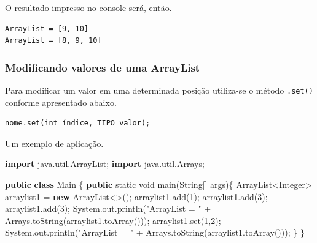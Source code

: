 \documentclass[
]{book}
\newenvironment{Shaded}{\begin{snugshade}}{\end{snugshade}}
\newcommand{\BuiltInTok}[1]{#1}
\newcommand{\DataTypeTok}[1]{\textcolor[rgb]{0.13,0.29,0.53}{#1}}
\newcommand{\DecValTok}[1]{\textcolor[rgb]{0.00,0.00,0.81}{#1}}
\newcommand{\FunctionTok}[1]{\textcolor[rgb]{0.00,0.00,0.00}{#1}}
\newcommand{\ImportTok}[1]{#1}
\newcommand{\KeywordTok}[1]{\textcolor[rgb]{0.13,0.29,0.53}{\textbf{#1}}}
\newcommand{\NormalTok}[1]{#1}
\newcommand{\StringTok}[1]{\textcolor[rgb]{0.31,0.60,0.02}{#1}}
\begin{document}
O resultado impresso no console será, então.

\begin{verbatim}
ArrayList = [9, 10]
ArrayList = [8, 9, 10]
\end{verbatim}

\hypertarget{modificando-valores-de-uma-arraylist}{%
\subsubsection*{Modificando valores de uma ArrayList}\label{modificando-valores-de-uma-arraylist}}

Para modificar um valor em uma determinada posição utiliza-se o método \texttt{.set()} conforme apresentado abaixo.

\begin{verbatim}
nome.set(int índice, TIPO valor);
\end{verbatim}

Um exemplo de aplicação.

\begin{Shaded}
\begin{Highlighting}[]
\KeywordTok{import}\ImportTok{ java.util.ArrayList;}
\KeywordTok{import}\ImportTok{ java.util.Arrays;}

\KeywordTok{public} \KeywordTok{class}\NormalTok{ Main \{}
    \KeywordTok{public} \DataTypeTok{static} \DataTypeTok{void} \FunctionTok{main}\NormalTok{(}\BuiltInTok{String}\NormalTok{[] args)\{}
        \BuiltInTok{ArrayList}\NormalTok{<}\BuiltInTok{Integer}\NormalTok{> arraylist1 = }\KeywordTok{new} \BuiltInTok{ArrayList}\NormalTok{<>();}
\NormalTok{        arraylist1.}\FunctionTok{add}\NormalTok{(}\DecValTok{1}\NormalTok{);}
\NormalTok{        arraylist1.}\FunctionTok{add}\NormalTok{(}\DecValTok{3}\NormalTok{);}
\NormalTok{        arraylist1.}\FunctionTok{add}\NormalTok{(}\DecValTok{3}\NormalTok{);}
        \BuiltInTok{System}\NormalTok{.}\FunctionTok{out}\NormalTok{.}\FunctionTok{println}\NormalTok{(}\StringTok{"ArrayList = "}\NormalTok{ + }\BuiltInTok{Arrays}\NormalTok{.}\FunctionTok{toString}\NormalTok{(arraylist1.}\FunctionTok{toArray}\NormalTok{()));}
\NormalTok{        arraylist1.}\FunctionTok{set}\NormalTok{(}\DecValTok{1}\NormalTok{,}\DecValTok{2}\NormalTok{);}
        \BuiltInTok{System}\NormalTok{.}\FunctionTok{out}\NormalTok{.}\FunctionTok{println}\NormalTok{(}\StringTok{"ArrayList = "}\NormalTok{ + }\BuiltInTok{Arrays}\NormalTok{.}\FunctionTok{toString}\NormalTok{(arraylist1.}\FunctionTok{toArray}\NormalTok{()));}
\NormalTok{    \}}
\NormalTok{\}}
\end{Highlighting}
\end{Shaded}
\end{document}
